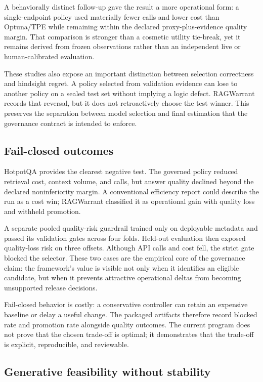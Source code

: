 \documentclass[11pt]{article}
\begin{document}
A behaviorally distinct follow-up gave the result a more operational
form: a single-endpoint policy used materially fewer calls and lower
cost than Optuna/TPE while remaining within the declared
proxy-plus-evidence quality margin. That comparison is stronger than a
cosmetic utility tie-break, yet it remains derived from frozen
observations rather than an independent live or human-calibrated
evaluation.

These studies also expose an important distinction between selection
correctness and hindsight regret. A policy selected from validation
evidence can lose to another policy on a sealed test set without
implying a logic defect. RAGWarrant records that reversal, but it does
not retroactively choose the test winner. This preserves the separation
between model selection and final estimation that the governance
contract is intended to enforce.

\subsection{Fail-closed outcomes}\label{sec:fail-closed}

HotpotQA provides the clearest negative test. The governed policy
reduced retrieval cost, context volume, and calls, but answer quality
declined beyond the declared noninferiority margin. A conventional
efficiency report could describe the run as a cost win; RAGWarrant
classified it as operational gain with quality loss and withheld
promotion.

A separate pooled quality-risk guardrail trained only on deployable
metadata and passed its validation gates across four folds. Held-out
evaluation then exposed quality-loss risk on three offsets. Although API
calls and cost fell, the strict gate blocked the selector. These two
cases are the empirical core of the governance claim: the
framework's value is visible not only when it identifies
an eligible candidate, but when it prevents attractive operational
deltas from becoming unsupported release decisions.

Fail-closed behavior is costly: a conservative controller can retain an
expensive baseline or delay a useful change. The packaged artifacts
therefore record blocked rate and promotion rate alongside quality
outcomes. The current program does not prove that the chosen trade-off
is optimal; it demonstrates that the trade-off is explicit,
reproducible, and reviewable.

\subsection{Generative feasibility without stability}\label{sec:generative}
\end{document}
